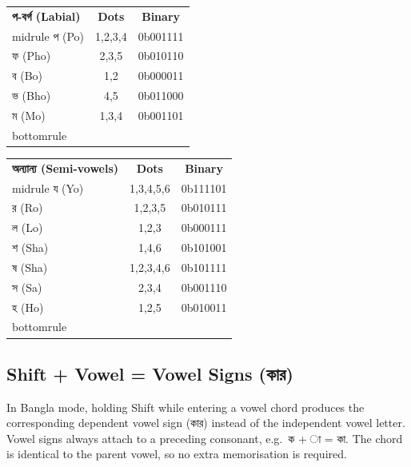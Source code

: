 \documentclass[11pt,a4paper,twoside]{article}
\newcommand{\bengali}[1]{#1}
\begin{document}
\begin{table}[H]
\vspace{0.6em}
\begin{minipage}{0.46\textwidth}
\begin{tabular}{l c c}\toprule
\textbf{প-বর্গ (Labial)} & \textbf{Dots} & \textbf{Binary} \\midrule
প (Po) & 1,2,3,4 & 0b001111 \\
ফ (Pho) & 2,3,5 & 0b010110 \\
ব (Bo) & 1,2   & 0b000011 \\
ভ (Bho) & 4,5  & 0b011000 \\
ম (Mo) & 1,3,4 & 0b001101 \\bottomrule
\end{tabular}
\end{minipage}\hfill
\begin{minipage}{0.46\textwidth}
\begin{tabular}{l c c}\toprule
\textbf{অন্যান্য (Semi-vowels)} & \textbf{Dots} & \textbf{Binary} \\midrule
য (Yo) & 1,3,4,5,6 & 0b111101 \\
র (Ro) & 1,2,3,5 & 0b010111 \\
ল (Lo) & 1,2,3 & 0b000111 \\
শ (Sha) & 1,4,6 & 0b101001 \\
ষ (Sha) & 1,2,3,4,6 & 0b101111 \\
স (Sa) & 2,3,4 & 0b001110 \\
হ (Ho) & 1,2,5 & 0b010011 \\bottomrule
\end{tabular}
\end{minipage}
\end{table}

\subsection{Shift + Vowel = Vowel Signs (\bengali{কার})}\label{sec:bangla-kar}
In Bangla mode, holding Shift while entering a vowel chord produces the
corresponding dependent vowel sign (\bengali{কার}) instead of the
independent vowel letter. Vowel signs always attach to a preceding
consonant, e.g.\ \bengali{ক} + \bengali{া} = \bengali{কা}. The chord is
identical to the parent vowel, so no extra memorisation is required.
\end{document}
